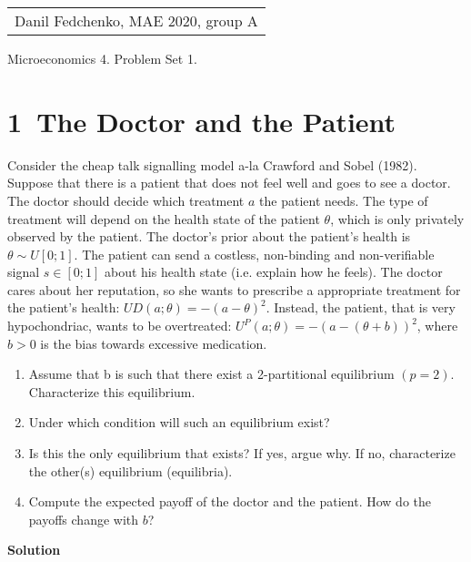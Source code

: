 \documentclass[a4paper]{article}
\begin{document}
	\begin{flushright}
	\begin{tabular}{r}
		Danil Fedchenko, MAE 2020, group A \\
	\end{tabular}
\end{flushright}


\begin{center}
	Microeconomics 4. Problem Set 1.
\end{center}
\section*{1\ The Doctor and the Patient}
Consider the cheap talk signalling model a-la Crawford and Sobel (1982). Suppose that
there is a patient that does not feel well and goes to see a doctor. The doctor should
decide which treatment $a$ the patient needs. The type of treatment will depend on
the health state of the patient $\theta$, which is only privately observed by the patient. The
doctor's prior about the patient's health is $\theta \sim U[0; 1]$. The patient can send a costless,
non-binding and non-verifiable signal $s \in [0; 1]$ about his health state (i.e. explain how
he feels). The doctor cares about her reputation, so she wants to prescribe a appropriate
treatment for the patient's health: $U
D(a; \theta) = -(a-\theta)^2$. Instead, the patient, that is
very hypochondriac, wants to be overtreated: $U^P(a; \theta) = -(a - (\theta + b))^2$, where $b > 0$ is
the bias towards excessive medication.
\begin{enumerate}
	\item Assume that b is such that there exist a 2-partitional equilibrium $(p = 2)$. Characterize this equilibrium.
	\item Under which condition will such an equilibrium exist?
	\item Is this the only equilibrium that exists? If yes, argue why. If no, characterize the
	other(s) equilibrium (equilibria).
	\item Compute the expected payoff of the doctor and the patient. How do the payoffs
	change with $b$?
\end{enumerate}

\textbf{Solution}
\end{document}
